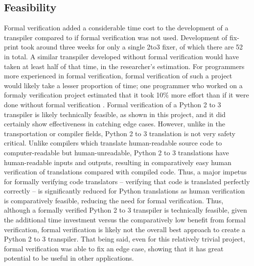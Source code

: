 \subsection{Feasibility}
Formal verification added a considerable time cost to the development of a transpiler compared to if formal verification was not used. Development of fix-print took around three weeks for only a single 2to3 fixer, of which there are 52 in total. A similar transpiler developed without formal verification would have taken at least half of that time, in the researcher's estimation. For programmers more experienced in formal verification, formal verification of such a project would likely take a lesser proportion of time; one programmer who worked on a formaly verification project estimated that it took 10\% more effort than if it were done without formal verification \autocite{Woodcock}. Formal verification of a Python 2 to 3 transpiler is likely technically feasible, as shown in this project, and it did certainly show effectiveness in catching edge cases. However, unlike in the transportation or compiler fields, Python 2 to 3 translation is not very safety critical. Unlike compilers which translate human-readable source code to computer-readable but human-unreadable, Python 2 to 3 translations have human-readable inputs and outputs, resulting in comparatively easy human verification of translations compared with compiled code. Thus, a major impetus for formally verifying code translators -- verifying that code is translated perfectly correctly -- is significantly reduced for Python translations as human verification is comparatively feasible, reducing the need for formal verification. Thus, although a formally verified Python 2 to 3 transpiler is technically feasible, given the additional time investment versus the comparatively low benefit from formal verification, formal verification is likely not the overall best approach to create a Python 2 to 3 transpiler. That being said, even for this relatively trivial project, formal verification was able to fix an edge case, showing that it has great potential to be useful in other applications.
